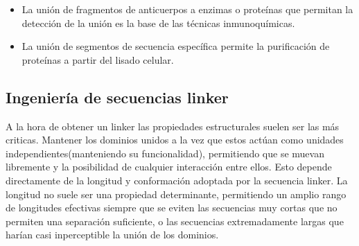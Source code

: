 \begin{itemize}
\item La unión de fragmentos de anticuerpos a enzimas o proteínas que permitan la detección de la unión es la base de las técnicas inmunoquímicas.
\item La unión de segmentos de secuencia específica permite la purificación de proteínas a partir del lisado celular. 

\end{itemize}












\subsection{Ingeniería de secuencias linker}




A la hora de obtener un linker las propiedades estructurales suelen ser las más criticas. 
Mantener los dominios unidos a la vez que estos actúan como unidades independientes(manteniendo su funcionalidad), permitiendo que se muevan libremente y la posibilidad de cualquier interacción entre ellos.
Esto depende directamente de la longitud y conformación adoptada por la secuencia linker. 
La longitud no suele ser una propiedad determinante, permitiendo un amplio rango de longitudes efectivas siempre que se eviten las secuencias muy cortas que no permiten una separación suficiente, 
o las secuencias extremadamente largas que harían casi inperceptible la unión de los dominios.

